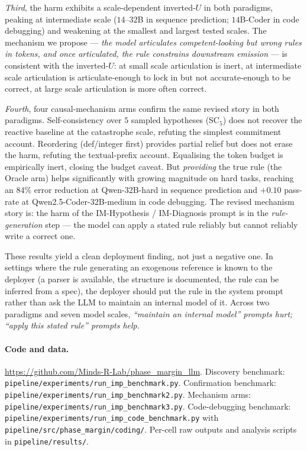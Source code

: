 \documentclass[11pt]{article}
\begin{document}
\emph{Third}, the harm exhibits a scale-dependent inverted-$U$
in both paradigms, peaking at intermediate scale ($14$--$32$B
in sequence prediction; $14$B-Coder in code debugging) and
weakening at the smallest and largest tested scales.  The
mechanism we propose --- \emph{the model articulates
competent-looking but wrong rules in tokens, and once
articulated, the rule constrains downstream emission} --- is
consistent with the inverted-$U$: at small scale articulation is
inert, at intermediate scale articulation is articulate-enough
to lock in but not accurate-enough to be correct, at large scale
articulation is more often correct.

\emph{Fourth}, four causal-mechanism arms confirm the same revised
story in both paradigms.  Self-consistency over $5$ sampled
hypotheses (SC$_5$) does not recover the reactive baseline at
the catastrophe scale, refuting the simplest commitment account.
Reordering (def/integer first) provides partial relief but does
not erase the harm, refuting the textual-prefix account.
Equalising the token budget is empirically inert, closing the
budget caveat.  But \emph{providing} the true rule (the Oracle
arm) helps significantly with growing magnitude on hard tasks,
reaching an $84\%$ error reduction at Qwen-32B-hard in sequence
prediction and $+0.10$ pass-rate at Qwen2.5-Coder-32B-medium in
code debugging.  The revised mechanism story is:  the harm of
the IM-Hypothesis / IM-Diagnosis prompt is in the
\emph{rule-generation} step --- the model can apply a stated
rule reliably but cannot reliably write a correct one.

These results yield a clean deployment finding, not just a
negative one.  In settings where the rule generating an
exogenous reference is known to the deployer (a parser is
available, the structure is documented, the rule can be inferred
from a spec), the deployer should put the rule in the system
prompt rather than ask the LLM to maintain an internal model
of it.  Across two paradigms and seven model scales,
\emph{``maintain an internal model'' prompts hurt;
``apply this stated rule'' prompts help.}

\paragraph{Code and data.}
\url{https://github.com/Minds-R-Lab/phase_margin_llm}.
Discovery benchmark:
\verb|pipeline/experiments/run_imp_benchmark.py|.
Confirmation benchmark:
\verb|pipeline/experiments/run_imp_benchmark2.py|.
Mechanism arms:
\verb|pipeline/experiments/run_imp_benchmark3.py|.
Code-debugging benchmark:
\verb|pipeline/experiments/run_imp_code_benchmark.py| with
\verb|pipeline/src/phase_margin/coding/|.
Per-cell raw outputs and analysis scripts in
\verb|pipeline/results/|.
\end{document}
